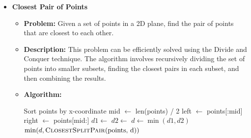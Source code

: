 \documentclass[12pt]{book} %
\begin{document}
\begin{itemize}
\begin{itemize}
\begin{lstlisting}[language=Python]
        merge_sort(left_half)
        merge_sort(right_half)

        i = j = k = 0

        while i < len(left_half) and j < len(right_half):
            if left_half[i] < right_half[j]:
                array[k] = left_half[i]
                i += 1
            else:
                array[k] = right_half[j]
                j += 1
            k += 1

        while i < len(left_half):
            array[k] = left_half[i]
            i += 1
            k += 1

        while j < len(right_half):
            array[k] = right_half[j]
            j += 1
            k += 1

array = [38, 27, 43, 3, 9, 82, 10]
merge_sort(array)
print(array)
        \end{lstlisting}
    \item \textbf{Closest Pair of Points}
        \begin{itemize}
        \item \textbf{Problem:} Given a set of points in a 2D plane, find the pair of points that are closest to each other.
        \item \textbf{Description:} This problem can be efficiently solved using the Divide and Conquer technique. The algorithm involves recursively dividing the set of points into smaller subsets, finding the closest pairs in each subset, and then combining the results.
        \item \textbf{Algorithm:}
            \begin{algorithm}[H]
            \caption{Closest Pair of Points}
            \begin{algorithmic}[1]
                \State Sort points by x-coordinate
                \State \Return {}
            \EndProcedure
                    \State \Return {}
                \EndIf
                \State mid $\gets$ len(points) / 2
                \State left $\gets$ points[:mid]
                \State right $\gets$ points[mid:]
                \State $d1 \gets$ 
                \State $d2 \gets$ 
                \State $d \gets \min(d1, d2)$
            \State \Return $\min(d, \text{\Call{ClosestSplitPair}{points, d}})$
        \EndProcedure

\end{algorithmic}
\end{algorithm}
\end{itemize}
\end{itemize}
\end{itemize}
\end{document}
